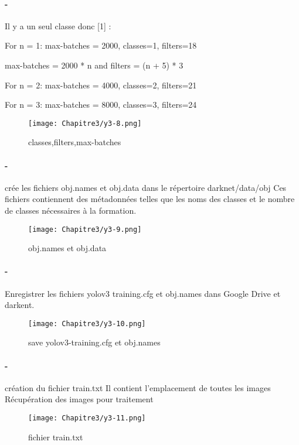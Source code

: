       \paragraph{-}  Il y a un seul classe donc [1] : 

      For n = 1: max-batches = 2000, classes=1, filters=18 

      max-batches = 2000 * n and filters = (n + 5) * 3 

      For n = 2: max-batches = 4000, classes=2, filters=21

      For n = 3: max-batches = 8000, classes=3, filters=24
      \begin{figure}[H]
           \centering
           \texttt{[image: Chapitre3/y3-8.png]}
           \caption{classes,filters,max-batches }
           \label{y3-8}
           \end{figure} 


      \paragraph{-}  crée les fichiers obj.names et obj.data dans le répertoire darknet/data/obj
      Ces fichiers contiennent des métadonnées telles que les noms des classes et le nombre de classes nécessaires à la formation.       
      \begin{figure}[H]
           \centering
           \texttt{[image: Chapitre3/y3-9.png]}
           \caption{obj.names et obj.data}
           \label{y3-9}
           \end{figure} 

      \paragraph{-} Enregistrer les fichiers yolov3 training.cfg et  obj.names dans Google Drive et darkent.
      \begin{figure}[H]
           \centering
           \texttt{[image: Chapitre3/y3-10.png]}
           \caption{save yolov3-training.cfg et obj.names }
           \label{y3-10}
           \end{figure} 

      \paragraph{-} création du fichier train.txt  
      Il contient l'emplacement de toutes les images  
      Récupération des images pour traitement
      \begin{figure}[H]
           \centering
           \texttt{[image: Chapitre3/y3-11.png]}
           \caption{ fichier train.txt }
           \label{y3-11}
           \end{figure}

